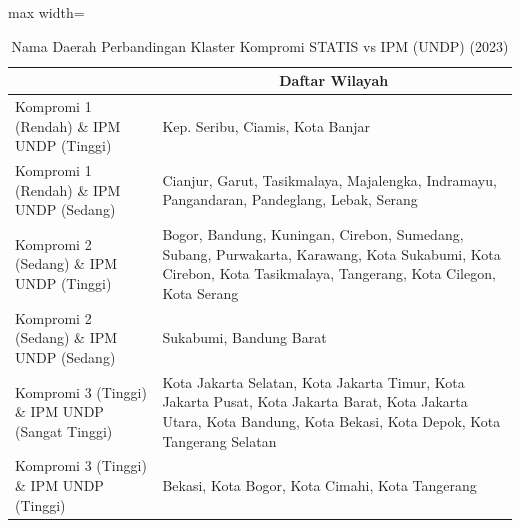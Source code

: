 \begin{table}[H]
\centering
\caption{Nama Daerah Perbandingan Klaster Kompromi STATIS vs IPM (UNDP) (2023)} \label{tab:app2comp_ipm_name_2023}
\begin{adjustbox}{max width=\textwidth}
\begin{tabular}{|>{\centering\arraybackslash}p{4cm}|p{10cm}|}
\hline
\multicolumn{1}{|c|}{\textbf{Kategori}} & \multicolumn{1}{c|}{\textbf{Daftar Wilayah}} \\
\hline
Kompromi 1 (Rendah) \& IPM UNDP (Tinggi) & Kep. Seribu, Ciamis, Kota Banjar \\
\hline
Kompromi 1 (Rendah) \& IPM UNDP (Sedang) & Cianjur, Garut, Tasikmalaya, Majalengka, Indramayu, Pangandaran, Pandeglang, Lebak, Serang \\
\hline
Kompromi 2 (Sedang) \& IPM UNDP (Tinggi) & Bogor, Bandung, Kuningan, Cirebon, Sumedang, Subang, Purwakarta, Karawang, Kota Sukabumi, Kota Cirebon, Kota Tasikmalaya, Tangerang, Kota Cilegon, Kota Serang \\
\hline
Kompromi 2 (Sedang) \& IPM UNDP (Sedang) & Sukabumi, Bandung Barat \\
\hline
Kompromi 3 (Tinggi) \& IPM UNDP (Sangat Tinggi) & Kota Jakarta Selatan, Kota Jakarta Timur, Kota Jakarta Pusat, Kota Jakarta Barat, Kota Jakarta Utara, Kota Bandung, Kota Bekasi, Kota Depok, Kota Tangerang Selatan \\
\hline
Kompromi 3 (Tinggi) \& IPM UNDP (Tinggi) & Bekasi, Kota Bogor, Kota Cimahi, Kota Tangerang \\
\hline
\end{tabular}
\end{adjustbox}
\end{table}